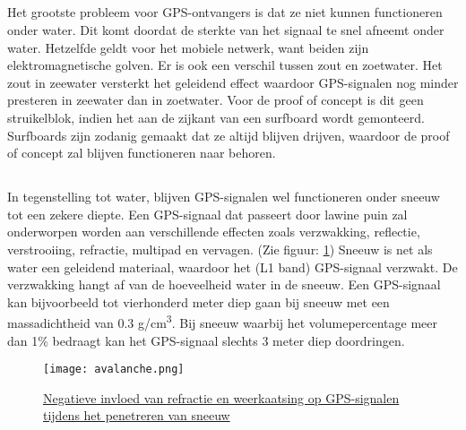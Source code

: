 \subsection{}
Het grootste probleem voor GPS-ontvangers is dat ze niet kunnen functioneren onder water. Dit komt doordat de sterkte van het signaal te snel afneemt onder water. Hetzelfde geldt voor het mobiele netwerk, want beiden zijn elektromagnetische golven. \autocite{underwater} Er is ook een verschil tussen zout en zoetwater. Het zout in zeewater versterkt het geleidend effect waardoor GPS-signalen nog minder presteren in zeewater dan in zoetwater. Voor de proof of concept is dit geen struikelblok, indien het aan de zijkant van een surfboard wordt gemonteerd. Surfboards zijn zodanig gemaakt dat ze altijd blijven drijven, waardoor de proof of concept zal blijven functioneren naar behoren.
\subsection{}
In tegenstelling tot water, blijven GPS-signalen wel functioneren onder sneeuw tot een zekere diepte. Een GPS-signaal dat passeert door lawine puin zal onderworpen worden aan verschillende effecten zoals verzwakking, reflectie, verstrooiing, refractie, multipad en vervagen. (Zie figuur: \ref{fig:avalanche}) Sneeuw is net als water een geleidend materiaal, waardoor het (L1 band) GPS-signaal verzwakt. De verzwakking hangt af van de hoeveelheid water in de sneeuw. Een GPS-signaal kan bijvoorbeeld tot vierhonderd meter diep gaan bij sneeuw met een massadichtheid van 0.3 g/cm\textsuperscript{3}. Bij sneeuw waarbij het volumepercentage meer dan 1\% bedraagt kan het GPS-signaal slechts 3 meter diep doordringen.\autocite{avalanche_gps}
\begin{figure}
    \texttt{[image: avalanche.png]}
    \caption[Negatieve invloed van refractie en weerkaatsing op GPS-signalen tijdens het penetreren van sneeuw]{\href{https://www.researchgate.net/figure/Signal-Paths-in-Avalanche-Debris_fig1_253280455}{Negatieve invloed van refractie en weerkaatsing op GPS-signalen tijdens het penetreren van sneeuw \autocite{avalanche_gps}}}
    \label{fig:avalanche}
\end{figure}
\pagebreak